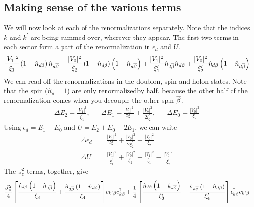 \documentclass[12pt,twoside]{report}
\numberwithin{equation}{section}
\begin{document}
\subsection{Making sense of the various terms}
We will now look at each of the renormalizations separately. Note that the indices \(k\) and \(k^\prime\) are being summed over, wherever they appear. The first two terms in each sector form a part of the renormalization in \(\epsilon_d\) and \(U\).
\begin{equation}\begin{aligned}
\frac{|V_1|^2}{\xi_1}\left( 1 - \hat n_{d\beta} \right) \hat n_{d\overline\beta} + \frac{|V_0|^2}{\xi_2}\left( 1 - \hat n_{d\beta} \right) \left( 1 - \hat n_{d\overline\beta} \right) + \frac{|V_1|^2}{\xi^\prime_1}\hat n_{d\overline\beta}\hat n_{d\beta} + \frac{|V_0|^2}{\xi^\prime_2}\hat n_{d\beta}\left(1 - \hat n_{d\overline\beta}\right)
\end{aligned}\end{equation}
We can read off the renormalizations in the doublon, spin and holon states. Note that the spin (\(\hat n_{d}=1\)) are only renormalizedby half, because the other half of the renormalization comes when you decouple the other spin \(\overline\beta\).
\begin{equation}\begin{aligned}
	\Delta E_2 = \frac{|V_1|^2}{\xi^\prime_1}, && \Delta E_1 =\frac{|V_1|^2}{2\xi_1} + \frac{|V_0|^2}{2\xi_2^\prime}, && \Delta E_0 = \frac{|V_0|^2}{\xi_2}
\end{aligned}\end{equation}
Using \(\epsilon_d = E_1 - E_0\) and \(U = E_2 + E_0 - 2E_1\), we can write
\begin{equation}\begin{aligned}
	\label{edU}
	\Delta \epsilon_d &= \frac{|V_1|^2}{2\xi_1} + \frac{|V_0|^2}{2\xi_2^\prime} - \frac{|V_0|^2}{\xi_2}\\
	\Delta U &= \frac{|V_1|^2}{\xi_1^\prime} + \frac{|V_0|^2}{\xi_2} - \frac{|V_1|^2}{\xi_1} - \frac{|V_0|^2}{\xi_2^\prime}
\end{aligned}\end{equation}
The \(J_z^2\) terms, together, give
\begin{equation}\begin{aligned}
\frac{J_z^2}{4}\left[\frac{\hat n_{d\beta}\left( 1 - \hat n_{d\overline\beta} \right) }{\xi_3} + \frac{\hat n_{d\overline\beta}\left( 1 - \hat n_{d\beta} \right)}{\xi_4} \right]c_{k^\prime\beta}c^\dagger_{k\beta} +\frac{1}{4}\left[ \frac{\hat n_{d\beta}\left( 1 - \hat n_{d\overline\beta} \right) }{\xi^\prime_3} + \frac{\hat n_{d\overline\beta}\left( 1 - \hat n_{d\beta} \right)}{\xi^\prime_4} \right]c^\dagger_{k\beta}c_{k^\prime\beta}
\end{aligned}\end{equation}
\end{document}
